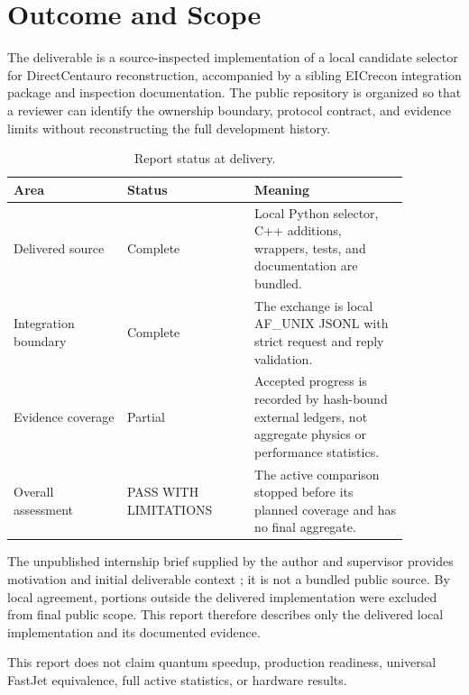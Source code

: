 \section{Outcome and Scope}
\measured The deliverable is a source-inspected implementation of a local candidate selector for DirectCentauro reconstruction, accompanied by a sibling EICrecon integration package and inspection documentation. The public repository is organized so that a reviewer can identify the ownership boundary, protocol contract, and evidence limits without reconstructing the full development history.

\begin{table}[htbp]\centering\small
\caption{Report status at delivery.}\begin{tabular}{L{0.25\linewidth}L{0.28\linewidth}L{0.34\linewidth}}\toprule
Area & Status & Meaning\\\midrule
Delivered source & Complete & Local Python selector, C++ additions, wrappers, tests, and documentation are bundled.\\
Integration boundary & Complete & The exchange is local AF\_UNIX JSONL with strict request and reply validation.\\
Evidence coverage & Partial & Accepted progress is recorded by hash-bound external ledgers, not aggregate physics or performance statistics.\\
Overall assessment & PASS WITH LIMITATIONS & The active comparison stopped before its planned coverage and has no final aggregate.\\\bottomrule
\end{tabular}\end{table}

The unpublished internship brief supplied by the author and supervisor provides motivation and initial deliverable context \cite{MitacsPlan2026}; it is not a bundled public source. By local agreement, portions outside the delivered implementation were excluded from final public scope. This report therefore describes only the delivered local implementation and its documented evidence.

\scope This report does not claim quantum speedup, production readiness, universal FastJet equivalence, full active statistics, or hardware results.
\clearpage
